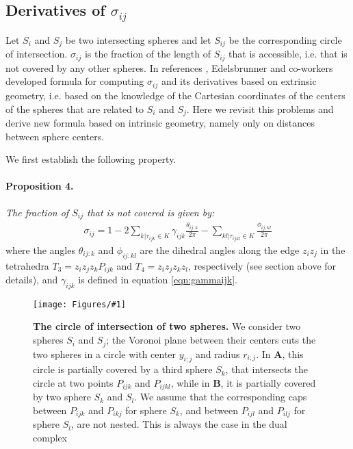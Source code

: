 \documentclass[11 pt]{article}
\theoremstyle{plain} \theorembodyfont{\rmfamily}
\newcommand{\centerfig}[2]{%
\centerline{\texttt{[image: Figures/\#1]}}
}
\begin{document}
   \subsection{Derivatives of $\sigma_{ij}$}
Let $S_i$ and $S_j$ be two intersecting spheres and let $S_{ij}$ be the corresponding circle of intersection. $\sigma_{ij}$ is the fraction of the length of $S_{ij}$ that is accessible,
i.e. that is not covered by any other spheres. In references \cite{BEKL04, AkEd19a}, Edelsbrunner and co-workers developed formula for computing $\sigma_{ij}$ and its derivatives based on extrinsic geometry, i.e. based on the knowledge of the Cartesian coordinates of the centers of the spheres that are related to $S_i$ and $S_j$. Here we revisit this problems and derive new formula based on intrinsic geometry, namely only on distances between sphere centers.

We first establish the following property.
\paragraph{Proposition 4.}
\emph{The fraction of $S_{ij}$ that is not covered is given by:}
\begin{eqnarray}
\sigma_{ij} = 1 - 2\sum_{k | \tau_{ijk} \in K} \gamma_{ijk} \frac{\theta_{ij:k}}{2\pi} - \sum_{kl | \tau_{ijkl} \in K} \frac{\phi_{ij:kl}}{2\pi}
\label{eqn:sigmaij}
\end{eqnarray}
where the angles $\theta_{ij:k}$ and $\phi_{ij:kl}$ are the dihedral angles along the edge $z_i z_j$ in the tetrahedra $T_3={z_iz_jz_k P_{ijk}}$ and $T_4 = {z_i z_j z_k z_l}$, respectively (see section above for details), and $\gamma_{ijk}$ is defined in equation \ref{eqn:gammaijk}.

\begin{figure}[hbt]
\centerfig{Sigma}{height=2.5in}
\caption{ \textbf{The circle of intersection of two spheres.} We consider two spheres $S_i$ and $S_j$; the Voronoi plane between their centers  cuts the two spheres in a circle  with center $y_{i;j}$ and radius $r_{i;j}$. In \textbf{A}, this circle is partially covered by a third sphere $S_k$, that intersects the circle at two points $P_{ijk}$ and $P_{ijkl}$, while in \textbf{B}, it is partially covered by two sphere $S_k$ and $S_l$. We assume that the corresponding caps between $P_{ijk}$ and $P_{ikj}$ for sphere $S_k$, and between $P_{ijl}$ and $P_{ilj}$ for sphere $S_l$, are not nested. This is always the case in the dual complex}
\label{fig:sigma}
\end{figure}
\end{document}
